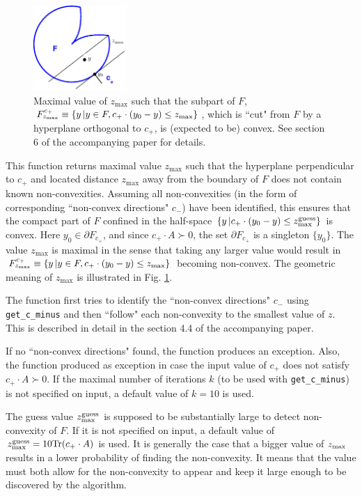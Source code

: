 \documentclass[a4paper]{article}
\theoremstyle{definition}
\begin{document}
\begin{enumerate}
\begin{figure}[H]
	\centering\includegraphics[width=100pt]{fig/get_z_max}
	\caption{Maximal value of $z_{\max}$ such that  the subpart of $F$, $F^{c_+}_{z_{\rm max}}\equiv \{y\, | y\in F, c_+ \cdot (y_0-y)\leq z_{\rm max}\}$, which is ``cut" from $F$ by a hyperplane orthogonal  to $c_+$, is (expected to be) convex. See section 6 of the accompanying paper for details. }
\label{fig:four}
\end{figure}


This function returns maximal value $z_{\max}$ such that the hyperplane perpendicular to $c_+$ and located distance $z_{\max}$ away from the boundary of $F$ does not contain known non-convexities. Assuming all non-convexities (in the form of corresponding ``non-convex directions" $c_-$) have been identified, this ensures that the compact part of $F$ confined in the half-space $\{y\, |c_+ \cdot (y_0-y)\leq z^{\rm guess}_{\rm max}\}$ is convex.
Here $y_0\in \partial F_{c_+}$, and since $c_+\cdot A\succ 0$, the set $\partial F_{c_+}$ is a singleton $\{y_0\}$.
The value $z_{\max}$ is maximal in the sense that taking any larger value would result in $F^{c_+}_{z_{\rm max}}\equiv \{y\, | y\in F, c_+ \cdot (y_0-y)\leq z_{\rm max}\}$ becoming non-convex. The geometric meaning of $z_{\max}$ is illustrated in Fig. \ref{fig:four}. 

The function first tries to identify the ``non-convex directions" $c_-$ using {\tt get\_c\_minus} and then ``follow" each non-convexity to the smallest value of $z$. This is described in detail in the section 4.4 of the accompanying paper.

If no ``non-convex directions" found, the function produces an exception.
Also, the function produced as exception in case the input value of $c_+$ does not satisfy $c_+\cdot A\succ 0$.
If the maximal number of iterations $k$ (to be used with {\tt get\_c\_minus}) is not specified on input, a default value of $k=10$ is used.

The guess value $z^{\rm guess}_{\rm max}$ is supposed to be substantially large to detect non-convexity of $F$.
If it is not specified on input, a default value of $z^{\rm guess}_{\rm max}=10 {\rm Tr}(c_+\cdot A)$ is used.
It is generally the case that a bigger value of $z_{\rm max}$ results in a lower probability of finding the non-convexity.
It means that the value must both allow for the non-convexity to appear and keep it large enough to be discovered by the algorithm.


\end{enumerate}
\end{document}
